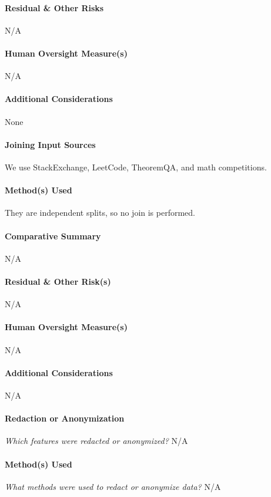 \paragraph{Residual \& Other Risks}
N/A

\paragraph{Human Oversight Measure(s)}
N/A

\paragraph{Additional Considerations}
None

\paragraph{Joining Input Sources}
We use StackExchange, LeetCode, TheoremQA, and math competitions.

\paragraph{Method(s) Used}
They are independent splits, so no join is performed.

\paragraph{Comparative Summary}
N/A

\paragraph{Residual \& Other Risk(s)}
N/A

\paragraph{Human Oversight Measure(s)}
N/A

\paragraph{Additional Considerations}
N/A

\paragraph{Redaction or Anonymization}
\textit{Which features were redacted or anonymized?}
N/A

\paragraph{Method(s) Used}
\textit{What methods were used to redact or anonymize data?}
N/A

